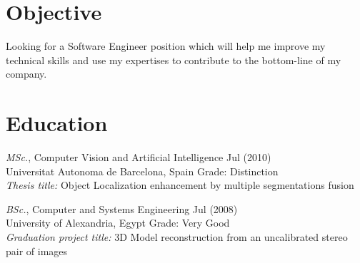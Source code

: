 \documentclass{res}
\begin{document}
\pagestyle{empty}
\renewcommand{\headrulewidth}{0.0pt}
\pagestyle{fancy}
\lhead{}
\chead{}
\rhead{}
\lfoot{}
\cfoot{}
\address{{\bf Current Address} \\ 2518 Alvin street \\ Mountain View, CA 94043 \\ +1 (650) 468-8277 \\ a.mounir86@gmail.com}
\address{{\bf School Address} \\ Computer Vision Center \\
  Edificio O, Campus UAB \\   Bellaterra 08193, Spain \\ +34 (651) 70-9872}      
                                  
\begin{resume}

\section{Objective}

Looking for a Software Engineer position which will help me improve my technical skills and use my expertises to contribute to
the bottom-line of my company.
 
\section{Education}

    {\sl MSc.}, Computer Vision and Artificial Intelligence \hfill Jul (2010) \\
    Universitat Autonoma de Barcelona, Spain \hspace{0.2in}  Grade: Distinction \\
    {\sl Thesis title:} Object Localization enhancement by multiple segmentations fusion

    {\sl BSc.}, Computer and Systems Engineering \hfill Jul (2008) \\
    University of Alexandria, Egypt \hspace{0.2in}  Grade: Very Good \\
    {\sl Graduation project title:} 3D Model reconstruction from an uncalibrated stereo pair of images
 

\end{resume}
\end{document}
